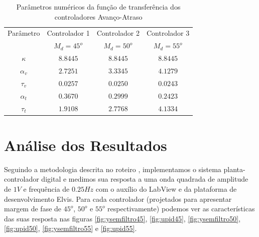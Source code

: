 \documentclass{article}
\begin{document}
\begin{table}[H]
	\centering
	\caption{Parâmetros numéricos da função de transferência dos controladores Avanço-Atraso}
	\label{tab:avat}
	\begin{tabular}{|c|c|c|c|}
		\hline Parâmetro & Controlador 1& Controlador 2& Controlador 3 \\ 
		&$M_d = 45^o$&$M_d = 50^o$&$M_d = 55^o$\\
		\hline $\kappa$ & $8.8445$ & $8.8445$ & $8.8445$\\ 
		\hline $\alpha_v$ & $2.7251$ & $3.3345$ & $4.1279$\\ 
		\hline $\tau_v$ & $0.0257$ & $0.0250$ & $0.0243$\\ 
		\hline $\alpha_t$ & $0.3670$ & $0.2999$ & $0.2423$\\ 
		\hline $\tau_t$ & $1.9108$ & $2.7768$ & $4.1334$\\ 
		\hline 
	\end{tabular} 
\end{table}

\section{Análise dos Resultados}
Seguindo a metodologia descrita no roteiro \cite{bb:roteiro}, implementamos o sistema planta-controlador digital e medimos sua resposta a uma onda quadrada de amplitude de $1V$ e frequência de $0.25Hz$ com o auxílio do LabView e da plataforma de desenvolvimento Elvis. Para cada controlador (projetados para apresentar margem de fase de $45^o$, $50^o$ e $55^o$ respectivamente) podemos ver as características das suas resposta nas figuras \ref{fig:ysemfiltro45}, \ref{fig:upid45}, \ref{fig:ysemfiltro50}, \ref{fig:upid50}, \ref{fig:ysemfiltro55} e \ref{fig:upid55}.
\end{document}
